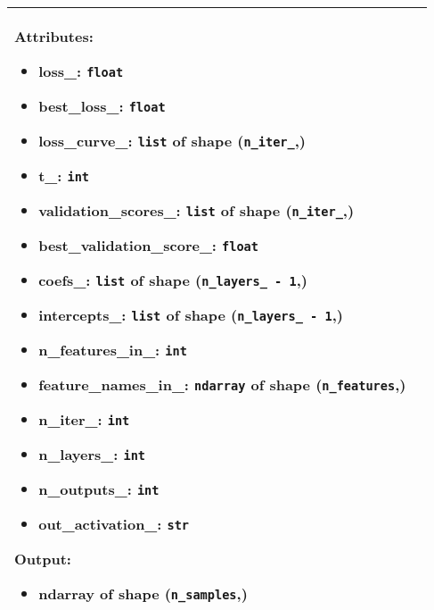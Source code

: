 \begin{longtable}{|l|p{12cm}|}
	Attributes:
	\begin{itemize}
		\item \textbf{loss\_}: \texttt{float}
		\item \textbf{best\_loss\_}: \texttt{float}
		\item \textbf{loss\_curve\_}: \texttt{list} of shape (\texttt{n\_iter\_},)
		\item \textbf{t\_}: \texttt{int}
		\item \textbf{validation\_scores\_}: \texttt{list} of shape (\texttt{n\_iter\_},)
		\item \textbf{best\_validation\_score\_}: \texttt{float}
		\item \textbf{coefs\_}: \texttt{list} of shape (\texttt{n\_layers\_ - 1},)
		\item \textbf{intercepts\_}: \texttt{list} of shape (\texttt{n\_layers\_ - 1},)
		\item \textbf{n\_features\_in\_}: \texttt{int}
		\item \textbf{feature\_names\_in\_}: \texttt{ndarray} of shape (\texttt{n\_features},)
		\item \textbf{n\_iter\_}: \texttt{int}
		\item \textbf{n\_layers\_}: \texttt{int}
		\item \textbf{n\_outputs\_}: \texttt{int}
		\item \textbf{out\_activation\_}: \texttt{str}
	\end{itemize}

	Output:
	\begin{itemize}
		\item \textbf{ndarray} of shape (\texttt{n\_samples},)
	\end{itemize} \\*
	\hline



\end{longtable}
